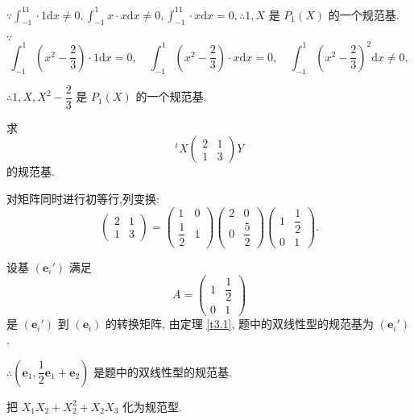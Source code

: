\documentclass[color=black,device=normal,lang=cn,mode=geye]{elegantnote}
\begin{document}
\begin{solution}
    $\because\int_{-1}^11\cdot 1\mathrm{d}x\neq0,\int_{-1}^1x\cdot x\mathrm{d}x\neq0,\int_{-1}^11\cdot x\mathrm{d}x=0,\therefore1,X$ 是 $P_1(X)$ 的一个规范基.

    $\because$
    \[\int_{-1}^1\left(x^2-\dfrac{2}{3}\right)\cdot 1\mathrm{d}x=0,\quad\int_{-1}^1\left(x^2-\dfrac{2}{3}\right)\cdot x\mathrm{d}x=0,\quad\int_{-1}^1\left(x^2-\dfrac{2}{3}\right)^2\mathrm{d}x\neq0,\]

    $\therefore1,X,X^2-\dfrac{2}{3}$ 是 $P_1(X)$ 的一个规范基.
\end{solution}
\begin{exercisec}\label{exc3}
    求
    \[^tX\begin{pmatrix}
        2 & 1 \\
        1 & 3
    \end{pmatrix}Y\]
    的规范基.
\end{exercisec}
\begin{solution}
    对矩阵同时进行初等行,列变换:
    \[\begin{pmatrix}
            2 & 1 \\
            1 & 3
        \end{pmatrix}=\begin{pmatrix}
            1 & 0 \\
            \dfrac{1}{2} & 1
        \end{pmatrix}\begin{pmatrix}
            2 & 0 \\
            0 & \dfrac{5}{2}
        \end{pmatrix}\begin{pmatrix}
            1 & \dfrac{1}{2} \\
            0 & 1
        \end{pmatrix}.\]

        设基 $(\boldsymbol{e}_i')$ 满足
        \[A=\begin{pmatrix}
            1 & \dfrac{1}{2} \\
            0 & 1
        \end{pmatrix}\]
        是 $(\boldsymbol{e}_i')$ 到 $(\boldsymbol{e}_i)$ 的转换矩阵, 由定理 \ref{t3.1}, 题中的双线性型的规范基为 $(\boldsymbol{e}_i')$.

        $\therefore\left(\boldsymbol{e}_1,\dfrac{1}{2}\boldsymbol{e}_1+\boldsymbol{e}_2\right)$ 是题中的双线性型的规范基.
\end{solution}
\begin{exercisec}%
    把 $X_1X_2+X_2^2+X_2X_3$ 化为规范型.
\end{exercisec}
\end{document}
